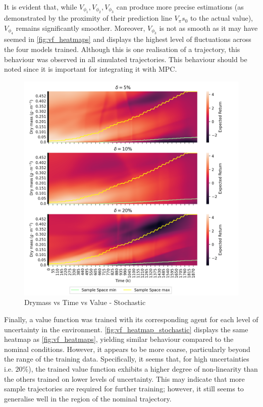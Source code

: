 \begin{remark}\label{rem:vf-smoothness}
	It is evident that, while $V_{\phi_1}, V_{\phi_2}, V_{\phi_3}$ can produce more precise estimations (as demonstrated by the proximity of their prediction line $V_{\pi}{s_0}$ to the actual value), $V_{\phi_4}$ remains significantly smoother. Moreover, $V_{\phi_3}$  is not as smooth as it may have seemed in \autoref{fig:vf_heatmaps} and displays the highest level of fluctuations across the four models trained. Although this is one realisation of a trajectory, this behaviour was observed in all simulated trajectories. This behaviour should be noted since it is important for integrating it with MPC.
\end{remark}



\begin{figure}[H]
	\centering
	\includegraphics[width = \textwidth]{figures/vf_heatmap_stochastic.png}
	\caption{Drymass vs Time vs Value - Stochastic}
	\label{fig:vf_heatmap_stochastic}
\end{figure}



Finally, a value function was trained with its corresponding agent for each level of uncertainty in the environment. \autoref{fig:vf_heatmap_stochastic} displays the same heatmap as \autoref{fig:vf_heatmaps}, yielding similar behaviour compared to the nominal conditions. However, it appears to be more coarse, particularly beyond the range of the training data. Specifically, it seems that, for high uncertainties i.e. $20\%$), the trained value function exhibits a higher degree of non-linearity than the others trained on lower levels of uncertainty. This may indicate that more sample trajectories are required for further training; however, it still seems to generalise well in the region of the nominal trajectory.



